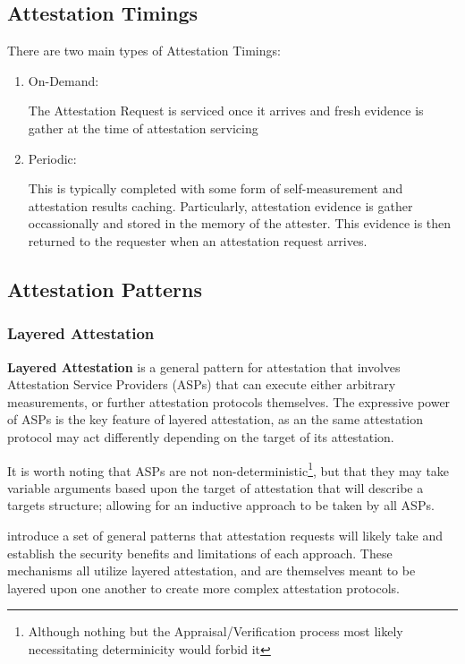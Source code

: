 \documentclass[acmsmall]{acmart}
\theoremstyle{definition}
\begin{document}
\subsection{Attestation Timings}
\label{sec:Attestation-Timings}
There are two main types of Attestation Timings:
\begin{enumerate}
  \item On-Demand:

        The Attestation Request is serviced once it arrives and fresh evidence is gather at the time of attestation servicing

  \item Periodic:

        This is typically completed with some form of self-measurement and attestation results caching. Particularly, attestation evidence is gather occassionally and stored in the memory of the attester. This evidence is then returned to the requester when an attestation request arrives.

\end{enumerate}

\subsection{Attestation Patterns} \label{sec:Attestation-Patterns}

\subsubsection{Layered Attestation} \label{sec:Layered-Attestation}

\textbf{Layered Attestation} is a general pattern for attestation that involves Attestation Service Providers (ASPs)
that can execute either arbitrary measurements, or further attestation protocols themselves.
The expressive power of ASPs is the key feature of layered attestation, as an the same attestation
protocol may act differently depending on the target of its attestation.

It is worth noting that ASPs are not non-deterministic\footnote{Although nothing
  but the Appraisal/Verification process most likely necessitating determinicity would forbid it},
but that they may take variable arguments based upon the target of attestation that
will describe a targets structure; allowing for an inductive approach to
be taken by all ASPs.

\citet{helble2021flexible} introduce a set of general patterns that attestation requests will likely take and establish the security benefits and limitations of each approach. These mechanisms all utilize layered attestation,
and are themselves meant to be layered upon one another to create more complex attestation protocols.
\end{document}

